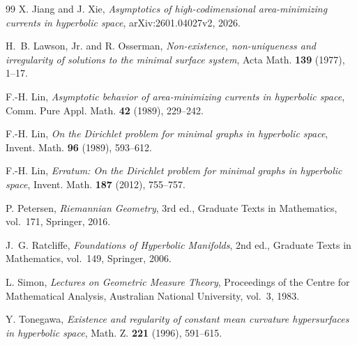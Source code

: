 \documentclass[11pt,reqno]{amsart}
\numberwithin{equation}{section}
\theoremstyle{definition}
\theoremstyle{remark}
\begin{document}
\begin{thebibliography}{99}
X. Jiang and J. Xie,
\emph{Asymptotics of high-codimensional area-minimizing currents in
hyperbolic space},
arXiv:2601.04027v2, 2026.

H.~B. Lawson, Jr. and R. Osserman,
\emph{Non-existence, non-uniqueness and irregularity of solutions to the
minimal surface system},
Acta Math. \textbf{139} (1977), 1--17.

F.-H. Lin,
\emph{Asymptotic behavior of area-minimizing currents in hyperbolic space},
Comm. Pure Appl. Math. \textbf{42} (1989), 229--242.

F.-H. Lin,
\emph{On the Dirichlet problem for minimal graphs in hyperbolic space},
Invent. Math. \textbf{96} (1989), 593--612.

F.-H. Lin,
\emph{Erratum: On the Dirichlet problem for minimal graphs in hyperbolic
space},
Invent. Math. \textbf{187} (2012), 755--757.

P. Petersen,
\emph{Riemannian Geometry},
3rd ed., Graduate Texts in Mathematics, vol.~171,
Springer, 2016.

J.~G. Ratcliffe,
\emph{Foundations of Hyperbolic Manifolds},
2nd ed., Graduate Texts in Mathematics, vol.~149,
Springer, 2006.

L. Simon,
\emph{Lectures on Geometric Measure Theory},
Proceedings of the Centre for Mathematical Analysis,
Australian National University, vol.~3, 1983.

Y. Tonegawa,
\emph{Existence and regularity of constant mean curvature hypersurfaces in
hyperbolic space},
Math. Z. \textbf{221} (1996), 591--615.

\end{thebibliography}
\end{document}
